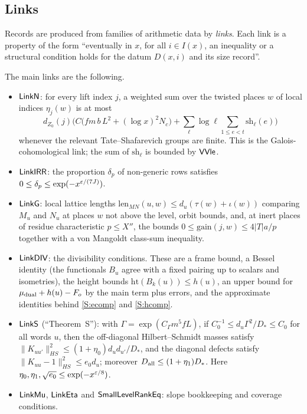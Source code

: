 \subsection{Links}

Records are produced from families of arithmetic data by \emph{links}. Each link is a property of the
form ``eventually in $x$, for all $i\in I(x)$, an inequality or a structural condition holds for the
datum $D(x,i)$ and its size record''.

\begin{definition}[Links]\label{def:links}
The main links are the following.
\begin{itemize}
\item $\mathsf{LinkN}$: for every lift index $j$, a weighted sum over the twisted places $w$ of local
indices $\eta_j(w)$ is at most
\[
d_{Z_0}(j)\Big(C\big(fm\,b\,L^2+(\log x)^2N_c\big)+\sum_\ell\log\ell\sum_{1\le e<t}\mathrm{sh}_\ell(e)\Big)
\]
whenever the relevant Tate--Shafarevich groups are finite. This is the Galois-cohomological link;
the sum of $\mathrm{sh}_\ell$ is bounded by $\mathsf{VVle}$.
\item $\mathsf{LinkIRR}$: the proportion $\delta_p$ of non-generic rows satisfies
$0\le\delta_p\le\exp(-x^{\varepsilon/(7J)})$.
\item $\mathsf{LinkG}$: local lattice lengths $\mathrm{len}_{MN}(u,w)\le d_u(\tau(w)+\iota(w))$ comparing
$M_u$ and $N_u$ at places $w$ not above the level, orbit bounds, and, at inert places of residue
characteristic $p\le X''$, the bounds $0\le\mathrm{gain}(j,w)\le4|T|a/p$ together with a von Mangoldt
class-sum inequality.
\item $\mathsf{LinkDIV}$: the divisibility conditions. These are a frame bound, a Bessel identity (the
functionals $B_u$ agree with a fixed pairing up to scalars and isometries), the height bounds
$\mathrm{ht}(B_k(u))\le h(u)$, an upper bound for $\mu_{\rm dual}+h(u)-F_o$ by the main term plus errors,
and the approximate identities behind \ref{S:ecomp} and \ref{S:hcomp}.
\item $\mathsf{LinkS}$ (``Theorem~S''): with $\Gamma=\exp(C_\Gamma m^5fL)$, if
$C_0^{-1}\le d_u\Gamma^2/D_*\le C_0$ for all words $u$, then the off-diagonal Hilbert--Schmidt masses
satisfy $\|K_{uu'}\|_{HS}^2\le(1+\eta_0)d_ud_{u'}/D_*$, and the diagonal defects satisfy
$\|K_{uu}-1\|_{HS}^2\le e_0d_u$; moreover $D_{\rm all}\le(1+\eta_1)D_*$. Here
$\eta_0,\eta_1,\sqrt{e_0}\le\exp(-x^{\varepsilon/8})$.
\item $\mathsf{LinkMu}$, $\mathsf{LinkEta}$ and $\mathsf{SmallLevelRankEq}$: slope bookkeeping
and coverage conditions.
\end{itemize}
\end{definition}

